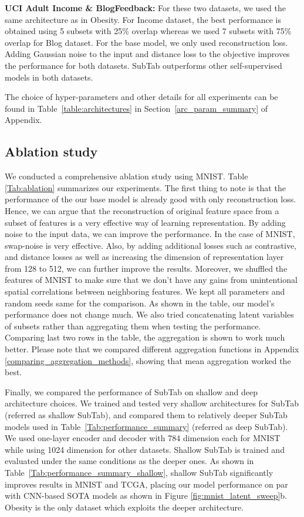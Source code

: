 \textbf{UCI Adult Income \& BlogFeedback:} For these two datasets, we used the same architecture as in Obesity. For Income dataset, the best performance is obtained using 5 subsets with 25\% overlap whereas we used 7 subsets with 75\% overlap for Blog dataset. For the base model, we only used reconstruction loss. Adding Gaussian noise to the input and distance loss to the objective improves the performance for both datasets. SubTab outperforms other self-supervised models in both datasets. 

The choice of hyper-parameters and other details for all experiments can be found in Table~\ref{table:architectures} in Section~\ref{arc_param_summary} of Appendix.

\subsection{Ablation study}\label{ablation_study}

 We conducted a comprehensive ablation study using MNIST. Table \ref{Tab:ablation} summarizes our experiments. The first thing to note is that the performance of the our base model is already good with only reconstruction loss. Hence, we can argue that the reconstruction of original feature space from a subset of features is a very effective way of learning representation. By adding noise to the input data, we can improve the performance. In the case of MNIST, swap-noise is very effective. Also, by adding additional losses such as contrastive, and distance losses as well as increasing the dimension of representation layer from 128 to 512, we can further improve the results. Moreover, we shuffled the features of MNIST to make sure that we don't have any gains from unintentional spatial correlations between neighboring features. We kept all parameters and random seeds same for the comparison. As shown in the table, our model's performance does not change much. We also tried concatenating latent variables of subsets rather than aggregating them when testing the performance. Comparing last two rows in the table, the aggregation is shown to work much better. Please note that we compared different aggregation functions in Appendix \ref{comparing_aggregation_methods}, showing that mean aggregation worked the best.

Finally, we compared the performance of SubTab on shallow and deep architecture choices. We trained and tested very shallow architectures for SubTab (referred as shallow SubTab), and compared them to relatively deeper SubTab models used in Table~\ref{Tab:performance_summary} (referred as deep SubTab). We used one-layer encoder and decoder with 784 dimension each for MNIST while using 1024 dimension for other datasets. Shallow SubTab is trained and evaluated under the same conditions as the deeper ones. As shown in Table~\ref{Tab:performance_summary_shallow}, shallow SubTab significantly improves results in MNIST and TCGA, placing our model performance on par with CNN-based SOTA models \citep{ji2019invariant, hu2017learning, kosiorek2019stacked, khacef2020improving, makhzani2015adversarial} as shown in Figure \ref{fig:mnist_latent_sweep}b. Obesity is the only dataset which exploits the deeper architecture.

